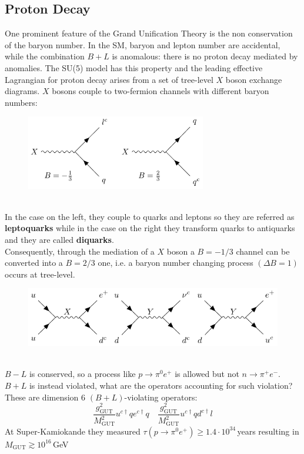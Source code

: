 \documentclass[../main.tex]{subfiles}
\begin{document}
\subsection{Proton Decay}
One prominent feature of the Grand Unification Theory is the non conservation of the baryon number. In the SM, baryon and lepton number are accidental, while the combination $B+L$ is anomalous: there is no proton decay mediated by anomalies.  The SU(5) model has this property and the leading effective Lagrangian for proton decay arises from a set of tree-level $X$ boson exchange diagrams. $X$ bosons couple to two-fermion channels with different baryon numbers:\\
\begin{figure}[h]
    \centering
    \includegraphics[width=0.7\textwidth]{Images/baryonnumber.pdf}
    \caption*{}
\end{figure}\\
In the case on the left, they couple to quarks and leptons so they are referred as \textbf{leptoquarks} while in the case on the right they transform quarks to antiquarks and they are called \textbf{diquarks}.\\
Consequently, through the mediation of a $X$ boson a $B=-1/3$ channel can be converted into a $B=2/3$ one, i.e. a baryon number changing process $(\Delta B=1)$ occurs at tree-level.\\
\begin{figure}[h]
    \centering
    \includegraphics{Images/xyy.pdf}
    \caption*{}
\end{figure}\\
$B-L$ is conserved, so a process like $p\to\pi^0e^+$ is allowed but not $n\to\pi^+e^-$. $B+L$ is instead violated, what are the operators accounting for such violation? These are dimension 6 $(B+L)$-violating operators:
\[
\frac{g^2_{\text{GUT}}}{M^2_{\text{GUT}}}u^{c\dagger}qe^{c\dagger}q \quad \frac{g^2_{\text{GUT}}}{M^2_{\text{GUT}}}u^{c\dagger}qd^{c\dagger}l 
\]
At Super-Kamiokande they measured $\tau(p\to\pi^0e^+)\ge1.4\cdot10^{34}$\,years resulting in $M_{\text{GUT}}\gtrsim10^{16}$\,GeV
\end{document}
